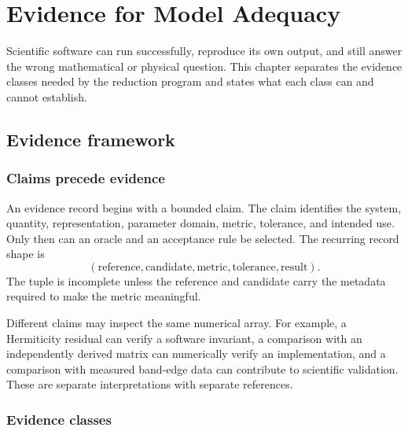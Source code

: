 \chapter{Evidence for Model Adequacy}

\label{ch:verification-and-validation}


Scientific software can run successfully, reproduce its own output, and still
answer the wrong mathematical or physical question. This chapter separates the
evidence classes needed by the reduction program and states what each class can
and cannot establish.

\section{Evidence framework}

\subsection{Claims precede evidence}


An evidence record begins with a bounded claim. The claim identifies the system,
quantity, representation, parameter domain, metric, tolerance, and intended use.
Only then can an oracle and an acceptance rule be selected. The recurring record
shape is
\begin{equation}
  (\text{reference},\text{candidate},\text{metric},
    \text{tolerance},\text{result}).
\end{equation}
The tuple is incomplete unless the reference and candidate carry the metadata
required to make the metric meaningful.

Different claims may inspect the same numerical array. For example, a
Hermiticity residual can verify a software invariant, a comparison with an
independently derived matrix can numerically verify an implementation, and a
comparison with measured band-edge data can contribute to scientific
validation. These are separate interpretations with separate references.

\subsection{Evidence classes}


